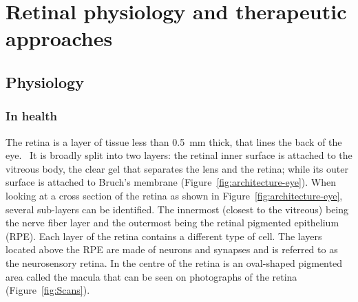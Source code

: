 \documentclass[12pt,a4paper]{journal}
\begin{document}
\section*{Retinal physiology and therapeutic approaches}

\subsection*{Physiology}

\subsubsection*{In health}


The retina is a layer of tissue less than \SI{0.5}{\mm} thick, that lines the back of the eye.~\cite{Gupta_2015}
It is broadly split into two layers: the retinal inner surface is attached to the vitreous body, the clear gel that separates the lens and the retina; while its outer surface is attached to Bruch's membrane (Figure~\ref{fig:architecture-eye}).
When looking at a cross section of the retina as shown in Figure~\ref{fig:architecture-eye}, several sub-layers can be identified. The innermost (closest to the vitreous) being the nerve fiber layer and the outermost being the retinal pigmented epithelium (RPE).
Each layer of the retina contains a different type of cell.
The layers located above the RPE are made of neurons and synapses and is referred to as the neurosensory retina.
In the centre of the retina is an oval-shaped pigmented area called the macula that can be seen on photographs of the retina (Figure~\ref{fig:Scans}).
\end{document}
